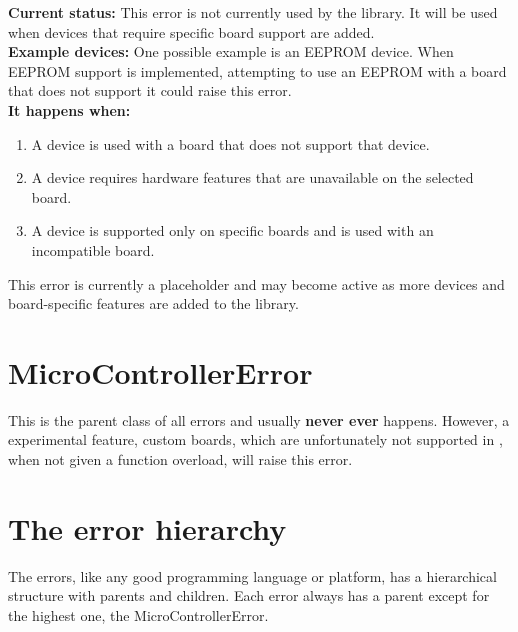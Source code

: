 	\textbf{Current status:} This error is not currently used by the library. It will be used when devices that require specific board support are added.\\
	
	\textbf{Example devices:} One possible example is an EEPROM device. When EEPROM support is implemented, attempting to use an EEPROM with a board that does not support it could raise this error.\\
	
	\textbf{It happens when:}
	
	
	\begin{enumerate}
		\item A device is used with a board that does not support that device.
		\item A device requires hardware features that are unavailable on the selected board.
		\item A device is supported only on specific boards and is used with an incompatible board.
	\end{enumerate}
	
	\begin{notebox}
		This error is currently a placeholder and may become active as more devices and board-specific features are added to the library.
	\end{notebox}
	\newpage
	
	\section{MicroControllerError}
	This is the parent class of all errors and usually \textbf{never ever} happens. However, a experimental feature, custom boards, which are unfortunately not supported in , when not given a  function overload, will raise this error.
	
	\section{The error hierarchy} 
	The errors, like any good programming language or platform, has a hierarchical structure with parents and children. Each error always has a parent except for the highest one, the MicroControllerError.
	
